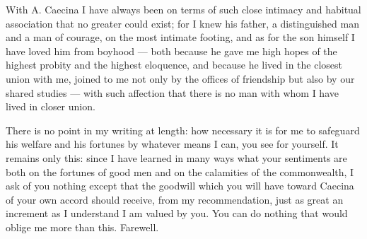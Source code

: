 

 With A. Caecina I have always been on terms of such close intimacy and habitual association that no greater could exist; for I knew his father, a distinguished man and a man of courage, on the most intimate footing, and as for the son himself I have loved him from boyhood --- both because he gave me high hopes of the highest probity and the highest eloquence, and because he lived in the closest union with me, joined to me not only by the offices of friendship but also by our shared studies --- with such affection that there is no man with whom I have lived in closer union.

 There is no point in my writing at length: how necessary it is for me to safeguard his welfare and his fortunes by whatever means I can, you see for yourself. It remains only this: since I have learned in many ways what your sentiments are both on the fortunes of good men and on the calamities of the commonwealth, I ask of you nothing except that the goodwill which you will have toward Caecina of your own accord should receive, from my recommendation, just as great an increment as I understand I am valued by you. You can do nothing that would oblige me more than this. Farewell.
